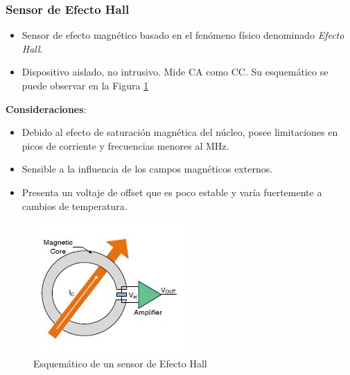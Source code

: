 \documentclass[10pt]{beamer}
\theoremstyle{remark}
\theoremstyle{definition}
\begin{document}
\begin{frame}[allowframebreaks]
	\frametitle{Sensor de Efecto Hall}
	\begin{itemize}
	  \item Sensor de efecto magnético basado en el fenómeno físico denominado
		\emph{Efecto Hall}.
	  \item Dispositivo aislado, no intrusivo. Mide CA como CC. Su esquemático
		se puede observar en la Figura \ref{sch_hall}
	\end{itemize}
	
	\textbf{Consideraciones}:
	\begin{itemize}
	  \item Debido al efecto de saturación magnética del núcleo, posee
		limitaciones en picos de corriente y frecuencias menores al MHz.
	  \item Sensible a la influencia de los campos magnéticos externos.
	  \item Presenta un voltaje de offset que es poco estable y varía
		fuertemente a cambios de temperatura.
	\end{itemize}
	
	\begin{figure}[h!]
	  \includegraphics{./images/Open-loop_Hall_Sensor.jpg}
	  \caption{Esquemático de un sensor de Efecto Hall}
	  \label{sch_hall}
	\end{figure}

\end{frame}
\end{document}
